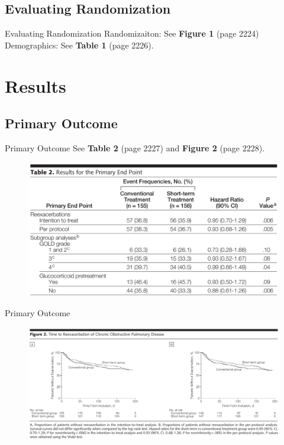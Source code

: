 \documentclass{beamer}
\begin{document}
	\subsection{Evaluating Randomization}
		\begin{frame}{Evaluating Randomization}
			Randomizaiton: See \textbf{Figure 1} (page 2224)
			\\
			Demographics: See \textbf{Table 1} (page 2226).
		\end{frame}
\section{Results}
	\subsection{Primary Outcome}
		\begin{frame}{Primary Outcome}
			See \textbf{Table 2} (page 2227) and \textbf{Figure 2} (page 2228).
			\begin{figure}
				\centering
				\includegraphics[width=1.0\linewidth]{../reports/figures/table2}
				\label{fig:table2}
			\end{figure}
		\end{frame}
		\begin{frame}{Primary Outcome}
			\begin{figure}
				\centering
				\includegraphics[width=1.0\textwidth]{../reports/figures/figure2}
				\label{fig:figure2}
			\end{figure}
		\end{frame}
\end{document}
